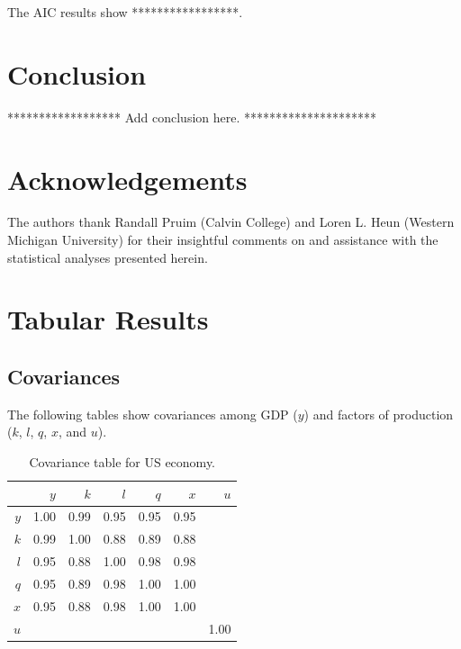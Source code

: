 \documentclass[preprint,authoryear,12pt]{elsarticle}\usepackage{graphicx, color}
\begin{document}
The AIC results show *****************.

\section{Conclusion}

****************** Add conclusion here. *********************

\section*{Acknowledgements}

The authors thank Randall Pruim (Calvin College) and Loren L. Heun (Western Michigan University) for their insightful comments on and assistance with the statistical analyses presented herein.


\appendix
\section{Tabular Results}

\subsection{Covariances}

The following tables show covariances among GDP ($y$) and factors of production ($k$, $l$, $q$, $x$, and $u$).

\begin{table}[H]
\begin{center}
\caption{Covariance table for  US economy.}
\label{tab:Covar_US}
\begin{tabular}{rrrrrrr}
  \hline
 & $y$ & $k$ & $l$ & $q$ & $x$ & $u$ \\ 
  \hline
$y$ & 1.00 & 0.99 & 0.95 & 0.95 & 0.95 &  \\ 
  $k$ & 0.99 & 1.00 & 0.88 & 0.89 & 0.88 &  \\ 
  $l$ & 0.95 & 0.88 & 1.00 & 0.98 & 0.98 &  \\ 
  $q$ & 0.95 & 0.89 & 0.98 & 1.00 & 1.00 &  \\ 
  $x$ & 0.95 & 0.88 & 0.98 & 1.00 & 1.00 &  \\ 
  $u$ &  &  &  &  &  & 1.00 \\ 
   \hline
\end{tabular}
\end{center}
\end{table}
\end{document}
